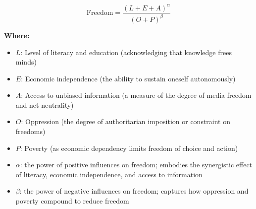 \[
\text{Freedom} = \frac{(L + E + A)^\alpha}{(O + P)^\beta}
\]

\textbf{Where:}

\begin{itemize}
    \item $L$: Level of literacy and education (acknowledging that knowledge frees minds)
    \item $E$: Economic independence (the ability to sustain oneself autonomously)
    \item $A$: Access to unbiased information (a measure of the degree of media freedom and net neutrality)
    \item $O$: Oppression (the degree of authoritarian imposition or constraint on freedoms)
    \item $P$: Poverty (as economic dependency limits freedom of choice and action)
    \item $\alpha$: the power of positive influences on freedom; embodies the synergistic effect of literacy, economic independence, and access to information
    \item $\beta$: the power of negative influences on freedom; captures how oppression and poverty compound to reduce freedom
\end{itemize}